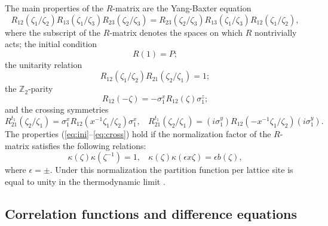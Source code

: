 \documentclass[a4paper,10pt]{article}
\begin{document}
The main properties of the $R$-matrix 
are the Yang-Baxter equation
\begin{equation}
R_{12}(\zeta_1/\zeta_2)
R_{13}(\zeta_1/\zeta_3)
R_{23}(\zeta_2/\zeta_3)=
R_{23}(\zeta_2/\zeta_3)
R_{13}(\zeta_1/\zeta_3)
R_{12}(\zeta_1/\zeta_2), 
\label{eq:YBE}
\end{equation}
where the subscript of the $R$-matrix denotes 
the spaces on which $R$ nontrivially acts; 
the initial condition 
\begin{equation}
R(1)=P; 
\label{eq:ini}
\end{equation}
the unitarity relation
\begin{equation}
R_{12}(\zeta_1/\zeta_2)R_{21}(\zeta_2/\zeta_1)=1; 
\label{eq:uni}
\end{equation}
the $\mathbb{Z}_2$-parity
\begin{equation}
R_{12}(-\zeta)=-\sigma^x_1 R_{12}(\zeta)\sigma^z_1 ; 
\label{eq:parity}
\end{equation}
and the crossing symmetries
\begin{equation}
R_{21}^{t_1}(\zeta_2/\zeta_1)=\sigma^x_1 
    R_{12}(x^{-1}\zeta_1/\zeta_2)\sigma^x_1 , ~~~~
    R_{21}^{t_1}(\zeta_2/\zeta_1)=(i\sigma^y_1 )
    R_{12}(-x^{-1}\zeta_1/\zeta_2)(i\sigma^y_1 ). 
\label{eq:cross}
\end{equation}
The properties (\ref{eq:ini}--\ref{eq:cross}) hold 
if the normalization factor of the $R$-matrix satisfies 
the following relations: 
\begin{equation}
\kappa (\zeta )\kappa (\zeta^{-1})=1, ~~~~
\kappa (\zeta )\kappa (\epsilon x\zeta)=\epsilon 
b(\zeta ), 
\label{eq:UC}
\end{equation}
where $\epsilon =\pm$. 
Under this normalization the partition function per 
lattice site is equal to unity in the thermodynamic 
limit \cite{ESM,JMbk}. 

\subsection{Correlation functions and difference equations}
\end{document}
